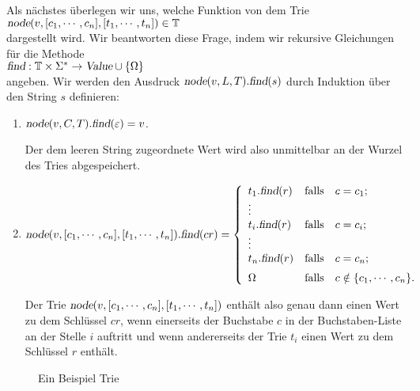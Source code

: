 Als n\"achstes \"uberlegen wir uns, welche Funktion von dem Trie \\[0.2cm]
\hspace*{1.3cm}  $\textsl{node}(v, [c_1, \cdots, c_n], [t_1, \cdots, t_n]) \in \mathbb{T}$ \\[0.2cm]
dargestellt wird.  Wir beantworten diese Frage, indem wir rekursive Gleichungen f\"ur die
Methode \\[0.2cm]
\hspace*{1.3cm} $\textsl{find}: \mathbb{T} \times \Sigma^* \rightarrow \textsl{Value} \cup \{ \Omega\}$
\\[0.2cm]
angeben.  Wir werden den Ausdruck $\textsl{node}(v,L,T).\textsl{find}(s)$ durch Induktion \"uber den String $s$
definieren:
\begin{enumerate}
\item $\textsl{node}(v, C, T).\textsl{find}(\varepsilon) = v$.

      Der dem leeren String zugeordnete Wert wird also unmittelbar an der Wurzel
      des Tries abgespeichert.
\item $\textsl{node}(v, [c_1, \cdots, c_n], [t_1, \cdots, t_n]).\textsl{find}(cr) = 
        \left\{
        \begin{array}{ll}
        t_1.\textsl{find}(r) & \mbox{falls} \quad c = c_1 \mbox{;} \\
        \vdots &                                     \\
        t_i.\textsl{find}(r) & \mbox{falls} \quad c = c_i \mbox{;} \\
        \vdots &                                     \\
        t_n.\textsl{find}(r) & \mbox{falls} \quad c = c_n \mbox{;} \\[0.2cm]
        \Omega               & \mbox{falls} \quad c \notin \{c_1,\cdots,c_n\} \mbox{.}         
        \end{array}
       \right.$

      Der Trie $\textsl{node}(v, [c_1, \cdots, c_n], [t_1, \cdots, t_n])$ enth\"alt also genau
      dann einen Wert zu dem Schl\"ussel $cr$, wenn einerseits der Buchstabe $c$ in der Buchstaben-Liste
      an der Stelle $i$ auftritt und wenn andererseits der Trie $t_i$ einen Wert zu dem
      Schl\"ussel $r$ enth\"alt.
\end{enumerate}

\begin{figure}[!ht]
  \centering
  \caption{Ein Beispiel Trie}
  \label{fig:trie}
\end{figure}

